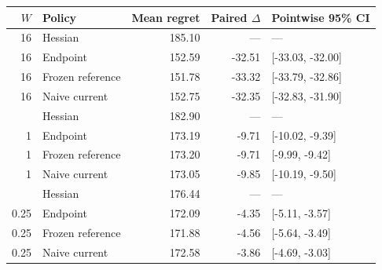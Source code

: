\begin{tabular}{@{}rlrrl@{}}
\toprule
$W$ & Policy & Mean regret & Paired $\Delta$ & Pointwise 95\% CI \\
\midrule
16 & Hessian & 185.10 & --- & --- \\
16 & Endpoint & 152.59 & -32.51 & [-33.03, -32.00] \\
16 & Frozen reference & 151.78 & -33.32 & [-33.79, -32.86] \\
16 & Naive current & 152.75 & -32.35 & [-32.83, -31.90] \\
\addlinespace
1 & Hessian & 182.90 & --- & --- \\
1 & Endpoint & 173.19 & -9.71 & [-10.02, -9.39] \\
1 & Frozen reference & 173.20 & -9.71 & [-9.99, -9.42] \\
1 & Naive current & 173.05 & -9.85 & [-10.19, -9.50] \\
\addlinespace
0.25 & Hessian & 176.44 & --- & --- \\
0.25 & Endpoint & 172.09 & -4.35 & [-5.11, -3.57] \\
0.25 & Frozen reference & 171.88 & -4.56 & [-5.64, -3.49] \\
0.25 & Naive current & 172.58 & -3.86 & [-4.69, -3.03] \\
\bottomrule
\end{tabular}
